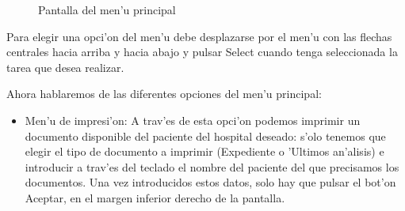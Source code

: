 \begin{enumerate}
\begin{figure}[h!]
	\begin{center}
     	\end{center}
    	\caption{Pantalla del men'u principal}\label{fig:pantalla_principal}
\end{figure}

Para elegir una opci'on del men'u debe desplazarse por el men'u con las flechas centrales hacia arriba y hacia abajo y pulsar Select cuando tenga seleccionada la tarea que desea realizar.

Ahora hablaremos de las diferentes opciones del men'u principal:
\begin{itemize}

\item Men'u de impresi'on:\newline
A trav'es de esta opci'on podemos imprimir un documento disponible del paciente del hospital deseado: s'olo tenemos que elegir el tipo de documento a imprimir (Expediente o 'Ultimos an'alisis) e introducir a trav'es del teclado el nombre del paciente del que precisamos los documentos. Una vez introducidos estos datos, solo hay que pulsar el bot'on Aceptar, en el margen inferior derecho de la pantalla.


\end{itemize}
\end{enumerate}
